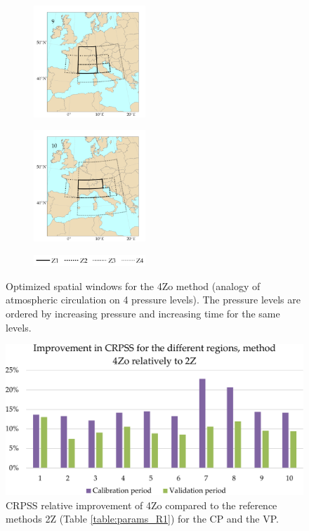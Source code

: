 \documentclass[5p]{elsarticle}
\begin{document}
\begin{figure}[htb]
\begin{subfigure}{.5\columnwidth}
	\end{subfigure}
	\begin{subfigure}{.5\columnwidth}
		\centering
		\includegraphics[width=4.2cm]{figures/spatial_win_z4/Spatial_windows_9.png}
	\end{subfigure}%
	\begin{subfigure}{.5\columnwidth}
		\centering
		\includegraphics[width=4.2cm]{figures/spatial_win_z4/Spatial_windows_10.png}
	\end{subfigure}
	\begin{subfigure}{.5\columnwidth}
		\centering
		\includegraphics[width=4.2cm]{figures/spatial_win_z4/legend.png}
	\end{subfigure}
	\caption{Optimized spatial windows for the 4Zo method (analogy of atmospheric circulation on 4 pressure levels). The pressure levels are ordered by increasing pressure and increasing time for the same levels.}
	\label{fig:spatial_windows_4Zo}
\end{figure}

\begin{figure}[htb]
	\centerline{\includegraphics[width=\linewidth]{figures/figure_dcrpss_4Zo.pdf}}
	\caption{CRPSS relative improvement of 4Zo compared to the reference methods 2Z (Table \ref{table:params_R1}) for the CP and the VP.}
	\label{fig:figure_dcrpss_4Zo}
\end{figure}
\end{document}
